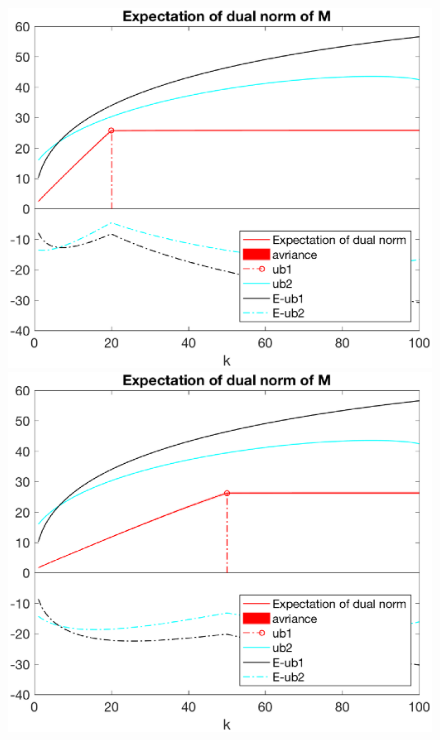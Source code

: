 \documentclass[12pt]{article}
\begin{document}
\begin{figure}[h]
    \begin{minipage}[c]{.4\linewidth}
        \centering
        \includegraphics[width=\linewidth]{Fig/dualnorm-u0ones-k0-20-minusnoise.eps}
    \end{minipage}
    \hfill%
    \begin{minipage}[c]{.4\linewidth}
        \centering
        \includegraphics[width=\linewidth]{Fig/dualnorm-u0ones-k0-50-minusnoise.eps}
    \end{minipage}
\end{figure}
\end{document}
